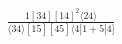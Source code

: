 \documentclass[varwidth, border=5pt]{standalone}
\begin{document}
\begin{my}
$\begin{gathered}
\scriptscriptstyle\frac{1[34][14]^2⟨24⟩}{⟨34⟩[15][45]⟨4|1+5|4]}
\end{gathered}$
\end{my}
\end{document}
